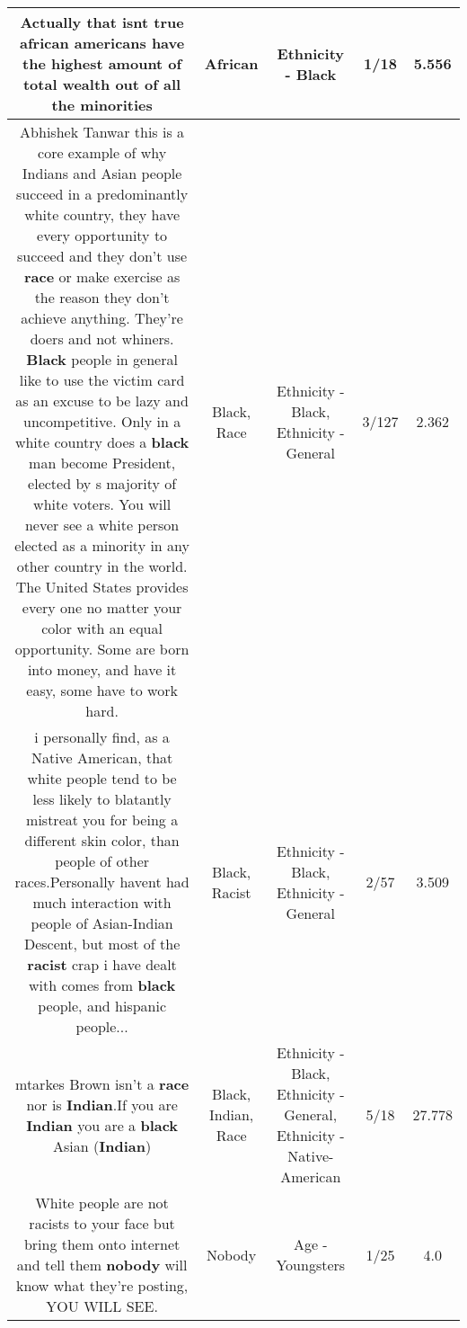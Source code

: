 \documentclass[11pt]{article}
\newlength\mylength
\begin{document}
\begin{center}
\begin{longtable}{|C{.65\mylength}|C{.30\mylength}|C{.12\mylength}|C{.12\mylength}|C{.12\mylength}|}
  \small Actually that isnt true \textbf{african} americans have the highest amount of total wealth out of all the minorities\normalsize   & African & Ethnicity - Black & 1/18 & 5.556 \\  \hline
  \small Abhishek Tanwar this is a core example of why Indians and Asian people succeed in a predominantly white country, they have every opportunity to succeed and they don't use \textbf{race} or make exercise as the reason they don't achieve anything.  They're doers and not whiners.  \textbf{Black} people in general like to use the victim card as an excuse to be lazy and uncompetitive.  Only in a white country does a \textbf{black} man become President, elected by s majority of white voters.  You will never see a white person elected as a minority in any other country in the world.  The United States provides every one no matter your color with an equal opportunity.  Some are born into money, and have it easy, some have to work hard.\normalsize   & Black, Race & Ethnicity - Black, Ethnicity - General & 3/127 & 2.362 \\  \hline
  \small i personally find, as a Native American, that white people tend to be less likely to blatantly mistreat you for being a different skin color, than people of other races.Personally havent had much interaction with people of Asian-Indian Descent, but most of the \textbf{racist} crap i have dealt with comes from \textbf{black} people, and hispanic people...\normalsize   & Black, Racist & Ethnicity - Black, Ethnicity - General & 2/57 & 3.509 \\  \hline
  \small mtarkes Brown isn't a \textbf{race} nor is \textbf{Indian}.If you are \textbf{Indian} you are a \textbf{black} Asian (\textbf{Indian})\normalsize   & Black, Indian, Race & Ethnicity - Black, Ethnicity - General, Ethnicity - Native-American & 5/18 & 27.778 \\  \hline
  \small White people are not racists to your face but bring them onto internet and tell them \textbf{nobody} will know what they're posting, YOU WILL SEE.\normalsize   & Nobody & Age - Youngsters & 1/25 & 4.0 \\  \hline

\end{longtable}
\end{center}
\end{document}
